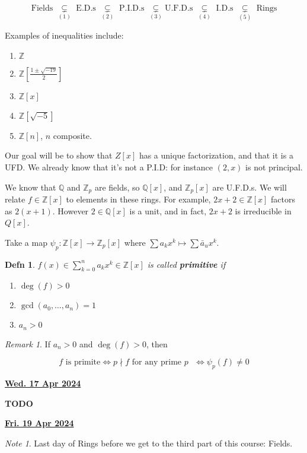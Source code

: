 \documentclass[12pt]{article}
\renewcommand{\date}[1]{\underline{\bf #1}}
\def\Z{{\mathbb Z}}
\def\Q{{\mathbb Q}}
\def\TODO{\color{red}\textbf{TODO}\color{black}}
\newtheorem{definition}{Defn}
\theoremstyle{remark}
\theoremstyle{remark}
\theoremstyle{remark}
\theoremstyle{remark}
\newtheorem*{remark}{Remark}
\theoremstyle{remark}
\newtheorem*{note}{Note}
\begin{document}
\[
  \text{Fields } \underset{(1)}{\subsetneq} \text{ E.D.s }
  \underset{(2)}{\subsetneq} \text{ P.I.D.s } \underset{(3)}{\subsetneq} \text{
  U.F.D.s } \underset{(4)}{\subsetneq} \text{ I.D.s } \underset{(5)}{\subsetneq}
  \text{ Rings}
\]

Examples of inequalities include:
\begin{enumerate}[label=(\arabic*)]
  \item $\Z$
  \item $\Z[\frac{1 \pm \sqrt{-19}}{2}]$
  \item $\Z[x]$
  \item $\Z[\sqrt{-5}]$
  \item $\Z[n]$, $n$ composite.
\end{enumerate}

Our goal will be to show that $Z[x]$ has a unique factorization, and that it is
a UFD. We already know that it's not a P.I.D: for instance $(2, x)$ is not
principal.

We know that $\Q$ and $\Z_p$ are fields, so $\Q[x]$, and $\Z_p[x]$ are U.F.D.s.
We will relate $f \in \Z[x]$ to elements in these rings. For example, $2x + 2
\in \Z[x]$ factors as $2 (x + 1)$. However $2 \in \Q[x]$ is a unit, and in fact,
$2x + 2$ is irreducible in $Q[x]$.

Take a map $\psi_p: \Z[x] \to \Z_p[x]$ where $\sum a_k x^k \mapsto \sum \bar a_u
x^k$.

\begin{definition}
  $f(x) \in \sum_{k = 0}^n a_k x^k \in \Z[x]$ is called {\bf primitive} if

  \begin{enumerate}
    \item $\deg(f) > 0$
    \item $\gcd(a_0, \dots, a_n) = 1$
    \item $a_n > 0$
  \end{enumerate}
\end{definition}

\begin{remark}
  If $a_n > 0$ and $\deg(f) > 0$, then

  \[
    f \text{ is primite} \Leftrightarrow p \nmid f \text{ for any prime $p$ } \Leftrightarrow \psi_p(f) \ne 0
  \]
\end{remark}

\date{Wed. 17 Apr 2024}

\TODO

\date{Fri. 19 Apr 2024}

\begin{note}
  Last day of Rings before we get to the third part of this course: Fields.
\end{note}
\end{document}

